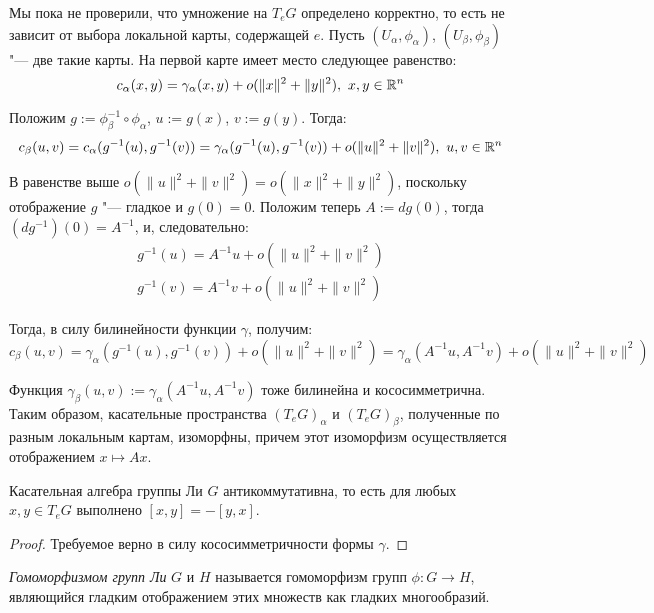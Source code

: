 \begin{note}
	Мы пока не проверили, что умножение на $T_e{G}$ определено корректно, то есть не зависит от выбора локальной карты, содержащей $e$. \pagebreak Пусть $(U_\alpha, \phi_\alpha)$, $(U_\beta, \phi_\beta)$ "--- две такие карты. На первой карте имеет место следующее равенство:
	\[c_\alpha(x, y) = \gamma_\alpha(x, y) + o(\|x\|^2 + \|y\|^2),~x, y \in \mathbb{R}^n\]
	
	Положим $g := \phi_\beta^{-1} \circ \phi_\alpha$, $u := g(x)$, $v := g(y)$. Тогда:
	\[c_\beta(u, v) = c_\alpha(g^{-1}(u), g^{-1}(v)) = \gamma_\alpha(g^{-1}(u), g^{-1}(v)) + o(\|u\|^2 + \|v\|^2),~u, v \in \mathbb{R}^n\]
	
	В равенстве выше $o(\|u\|^2 + \|v\|^2) = o(\|x\|^2 + \|y\|^2)$, поскольку отображение $g$ "--- гладкое и $g(0) = 0$. Положим теперь $A := dg(0)$, тогда $(dg^{-1})(0) = A^{-1}$, и, следовательно:
	\begin{gather*}
		g^{-1}(u) = A^{-1}u + o(\|u\|^2 + \|v\|^2) \\
		g^{-1}(v) = A^{-1}v + o(\|u\|^2 + \|v\|^2)
	\end{gather*}
	
	Тогда, в силу билинейности функции $\gamma$, получим:
	\[c_\beta(u, v) = \gamma_\alpha(g^{-1}(u), g^{-1}(v)) + o(\|u\|^2 + \|v\|^2) = \gamma_\alpha(A^{-1}u, A^{-1}v) + o(\|u\|^2 + \|v\|^2)\]
	
	Функция $\gamma_\beta(u, v) := \gamma_\alpha(A^{-1}u, A^{-1}v)$ тоже билинейна и кососимметрична. Таким образом, касательные пространства $(T_eG)_\alpha$ и $(T_eG)_\beta$, полученные по разным локальным картам, изоморфны, причем этот изоморфизм осуществляется отображением $x \mapsto Ax$.
\end{note}

\begin{proposition}
	Касательная алгебра группы Ли $G$ антикоммутативна, то есть для любых $x, y \in T_eG$ выполнено $[x, y] = -[y, x]$.
\end{proposition}

\begin{proof}
	Требуемое верно в силу кососимметричности формы $\gamma$.
\end{proof}

\begin{definition}
	\textit{Гомоморфизмом групп Ли} $G$ и $H$ называется гомоморфизм групп $\phi: G \to H$, являющийся гладким отображением этих множеств как гладких многообразий.
\end{definition}

